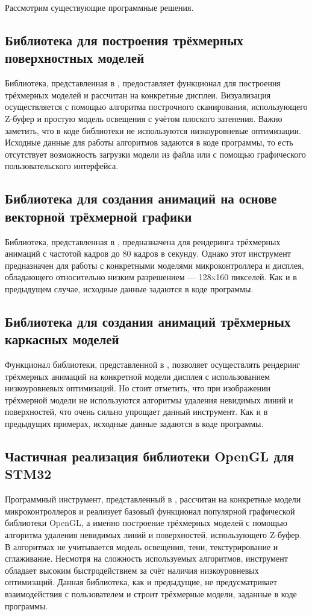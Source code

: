 Рассмотрим существующие программные решения.

\subsection{Библиотека для построения трёхмерных поверхностных моделей}
Библиотека, представленная в \cite{git1}, предоставляет функционал для построения трёхмерных моделей и рассчитан на конкретные дисплеи. 
Визуализация осуществляется с помощью алгоритма построчного сканирования, использующего Z-буфер и простую модель освещения с учётом 
плоского затенения. Важно заметить, что в коде библиотеки не используются низкоуровневые оптимизации. Исходные данные для работы 
алгоритмов задаются в коде программы, то есть отсутствует возможность загрузки модели из файла или с помощью графического 
пользовательского интерфейса.

\subsection{Библиотека для создания анимаций на основе векторной трёхмерной графики}
Библиотека, представленная в \cite{git2}, предназначена для рендеринга трёхмерных анимаций с частотой кадров до 80 кадров в секунду. Однако этот инструмент предназначен 
для работы с конкретными моделями микроконтроллера и дисплея, обладающего относительно низким разрешением — 128x160 пикселей. Как и в 
предыдущем случае, исходные данные задаются в коде программы.

\subsection{Библиотека для создания анимаций трёхмерных каркасных моделей}
Функционал библиотеки, представленной в \cite{git3}, позволяет осуществлять рендеринг трёхмерных анимаций на конкретной модели дисплея с использованием низкоуровневых 
оптимизаций. Но стоит отметить, что при изображении трёхмерной модели не используются алгоритмы удаления невидимых линий и поверхностей, 
что очень сильно упрощает данный инструмент. Как и в предыдущих примерах, исходные данные задаются в коде программы.

\subsection{Частичная реализация библиотеки OpenGL для STM32}
Программный инструмент, представленный в \cite{git4}, рассчитан на конкретные модели микроконтроллеров и реализует базовый функционал популярной графической библиотеки 
OpenGL, а именно построение трёхмерных моделей с помощью алгоритма удаления невидимых линий и поверхностей, использующего Z-буфер. В 
алгоритмах не учитывается модель освещения, тени, текстурирование и сглаживание. Несмотря на сложность используемых алгоритмов, инструмент 
обладает высоким быстродействием за счёт наличия низкоуровневых оптимизаций. Данная библиотека, как и предыдущие, не предусматривает 
взаимодействия с пользователем и строит трёхмерные модели, заданные в коде программы.

